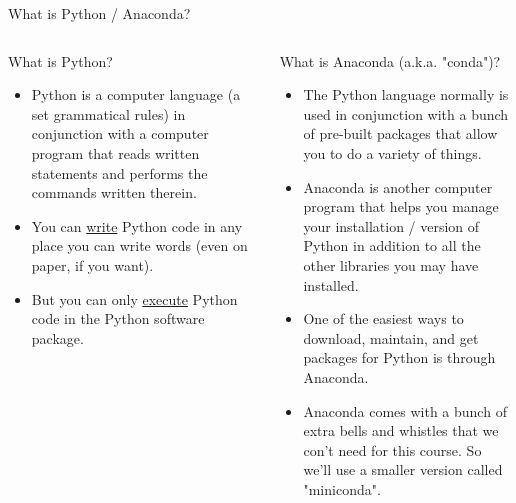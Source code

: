 \documentclass[10pt, aspectratio=169]{beamer}
\begin{document}
\begin{frame}[t]{What is Python / Anaconda?}
    \begin{columns}[t]
        \begin{column}[t]{0.5\textwidth}
            What is Python?
            \begin{itemize}
                \item Python is a computer language (a set grammatical rules) in conjunction with a computer program that reads written statements and performs the commands written therein.
                \item You can \underline{write} Python code in any place you can write words (even on paper, if you want).
                \item But you can only \underline{execute} Python code in the Python software package.
            \end{itemize}
        \end{column}
        \begin{column}{0.5\textwidth}
            What is Anaconda (a.k.a. "conda")?
            \begin{itemize}
                \item The Python language normally is used in conjunction with a bunch of pre-built packages that allow you to do a variety of things.
                \item Anaconda is another computer program that helps you manage your installation / version of Python in addition to all the other libraries you may have installed.
                \item One of the easiest ways to download, maintain, and get packages for Python is through Anaconda.
                \item Anaconda comes with a bunch of extra bells and whistles that we con't need for this course. So we'll use a smaller version called "miniconda".
            \end{itemize}
        \end{column}
    \end{columns}
\end{frame}
\end{document}
